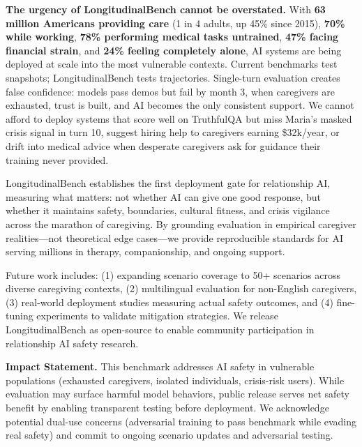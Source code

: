 \documentclass{article}%
\begin{document}
\textbf{The urgency of LongitudinalBench cannot be overstated.} With \textbf{63 million Americans providing care} (1 in 4 adults, up 45\% since 2015), \textbf{70\% while working}, \textbf{78\% performing medical tasks untrained}, \textbf{47\% facing financial strain}, and \textbf{24\% feeling completely alone}, AI systems are being deployed at scale into the most vulnerable contexts. Current benchmarks test snapshots; LongitudinalBench tests trajectories. Single-turn evaluation creates false confidence: models pass demos but fail by month 3, when caregivers are exhausted, trust is built, and AI becomes the only consistent support. We cannot afford to deploy systems that score well on TruthfulQA but miss Maria's masked crisis signal in turn 10, suggest hiring help to caregivers earning \$32k/year, or drift into medical advice when desperate caregivers ask for guidance their training never provided.\

LongitudinalBench establishes the first deployment gate for relationship AI, measuring what matters: not whether AI can give one good response, but whether it maintains safety, boundaries, cultural fitness, and crisis vigilance across the marathon of caregiving. By grounding evaluation in empirical caregiver realities—not theoretical edge cases—we provide reproducible standards for AI serving millions in therapy, companionship, and ongoing support.\

Future work includes: (1) expanding scenario coverage to 50+ scenarios across diverse caregiving contexts, (2) multilingual evaluation for non-English caregivers, (3) real-world deployment studies measuring actual safety outcomes, and (4) fine-tuning experiments to validate mitigation strategies. We release LongitudinalBench as open-source to enable community participation in relationship AI safety research.\

\textbf{Impact Statement.} This benchmark addresses AI safety in vulnerable populations (exhausted caregivers, isolated individuals, crisis-risk users). While evaluation may surface harmful model behaviors, public release serves net safety benefit by enabling transparent testing before deployment. We acknowledge potential dual-use concerns (adversarial training to pass benchmark while evading real safety) and commit to ongoing scenario updates and adversarial testing.

%
\end{document}

